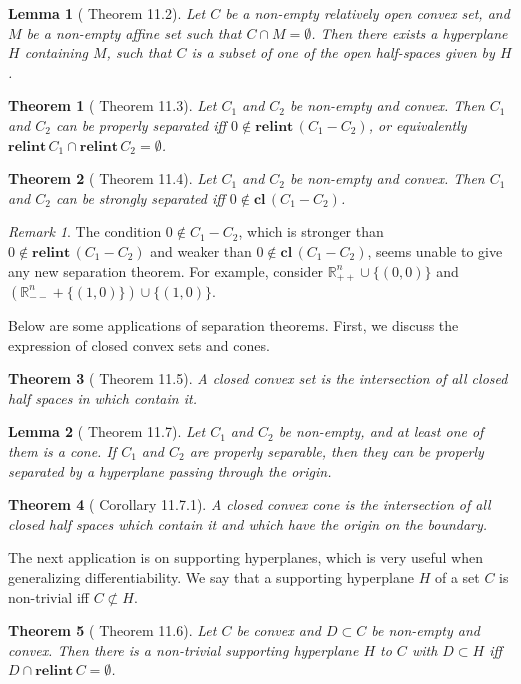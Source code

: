 \documentclass[openany]{book}
\newtheorem{lemma}{Lemma}[chapter]
\newtheorem{theorem}{Theorem}[chapter]
\theoremstyle{definition}
\theoremstyle{remark}
\newtheorem*{remark}{Remark}
\begin{document}
\begin{lemma}[\cite{R15} Theorem 11.2]\label{lemma:separation}
    Let $C$ be a non-empty relatively open convex set, and $M$ be a non-empty affine set such that $C\cap M=\emptyset$. Then there exists a hyperplane $H$ containing $M$, such that $C$ is a subset of one of the open half-spaces given by $H$.
\end{lemma}
\begin{theorem}[\cite{R15} Theorem 11.3]
    Let $C_1$ and $C_2$ be non-empty and convex. Then $C_1$ and $C_2$ can be properly separated iff $0\not\in \mathbf{relint}\,(C_1-C_2)$, or equivalently $\mathbf{relint}\,C_1\cap \mathbf{relint}\,C_2=\emptyset$.
\end{theorem}
\begin{theorem}[\cite{R15} Theorem 11.4]
    Let $C_1$ and $C_2$ be non-empty and convex. Then $C_1$ and $C_2$ can be strongly separated iff $0\not\in \mathbf{cl}\,(C_1-C_2)$.
\end{theorem}
\begin{remark}
    The condition $0\not\in C_1-C_2$, which is stronger than $0\not\in \mathbf{relint}\,(C_1-C_2)$ and weaker than $0\not\in \mathbf{cl}\,(C_1-C_2)$, seems unable to give any new separation theorem. For example, consider $\mathbb{R}_{++}^n\cup\{(0,0)\}$ and $(\mathbb{R}_{--}^n+\{(1,0)\})\cup\{(1,0)\}$.
\end{remark}

Below are some applications of separation theorems. First, we discuss the expression of closed convex sets and cones.
\begin{theorem}[\cite{R15} Theorem 11.5]
    A closed convex set is the intersection of all closed half spaces in which contain it.
\end{theorem}
\begin{lemma}[\cite{R15} Theorem 11.7]
    Let $C_1$ and $C_2$ be non-empty, and at least one of them is a cone. If $C_1$ and $C_2$ are properly separable, then they can be properly separated by a hyperplane passing through the origin.
\end{lemma}
\begin{theorem}[\cite{R15} Corollary 11.7.1]
    A closed convex cone is the intersection of all closed half spaces which contain it and which have the origin on the boundary.
\end{theorem}

The next application is on supporting hyperplanes, which is very useful when generalizing differentiability. We say that a supporting hyperplane $H$ of a set $C$ is non-trivial iff $C\not\subset H$.
\begin{theorem}[\cite{R15} Theorem 11.6]
    Let $C$ be convex and $D\subset C$ be non-empty and convex. Then there is a non-trivial supporting hyperplane $H$ to $C$ with $D\subset H$ iff $D\cap \mathbf{relint}\,C=\emptyset$.
\end{theorem}
\end{document}
